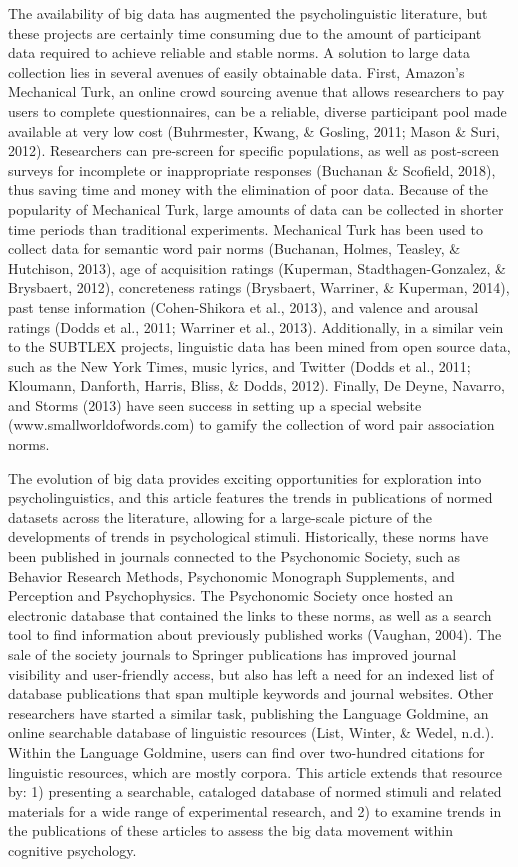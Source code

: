 \documentclass[english,,man]{apa6}
\theoremstyle{definition}
\theoremstyle{definition}
\theoremstyle{definition}
\theoremstyle{remark}
\begin{document}
The availability of big data has augmented the psycholinguistic
literature, but these projects are certainly time consuming due to the
amount of participant data required to achieve reliable and stable
norms. A solution to large data collection lies in several avenues of
easily obtainable data. First, Amazon's Mechanical Turk, an online crowd
sourcing avenue that allows researchers to pay users to complete
questionnaires, can be a reliable, diverse participant pool made
available at very low cost (Buhrmester, Kwang, \& Gosling, 2011; Mason
\& Suri, 2012). Researchers can pre-screen for specific populations, as
well as post-screen surveys for incomplete or inappropriate responses
(Buchanan \& Scofield, 2018), thus saving time and money with the
elimination of poor data. Because of the popularity of Mechanical Turk,
large amounts of data can be collected in shorter time periods than
traditional experiments. Mechanical Turk has been used to collect data
for semantic word pair norms (Buchanan, Holmes, Teasley, \& Hutchison,
2013), age of acquisition ratings (Kuperman, Stadthagen-Gonzalez, \&
Brysbaert, 2012), concreteness ratings (Brysbaert, Warriner, \&
Kuperman, 2014), past tense information (Cohen-Shikora et al., 2013),
and valence and arousal ratings (Dodds et al., 2011; Warriner et al.,
2013). Additionally, in a similar vein to the SUBTLEX projects,
linguistic data has been mined from open source data, such as the New
York Times, music lyrics, and Twitter (Dodds et al., 2011; Kloumann,
Danforth, Harris, Bliss, \& Dodds, 2012). Finally, De Deyne, Navarro,
and Storms (2013) have seen success in setting up a special website
(www.smallworldofwords.com) to gamify the collection of word pair
association norms.

The evolution of big data provides exciting opportunities for
exploration into psycholinguistics, and this article features the trends
in publications of normed datasets across the literature, allowing for a
large-scale picture of the developments of trends in psychological
stimuli. Historically, these norms have been published in journals
connected to the Psychonomic Society, such as Behavior Research Methods,
Psychonomic Monograph Supplements, and Perception and Psychophysics. The
Psychonomic Society once hosted an electronic database that contained
the links to these norms, as well as a search tool to find information
about previously published works (Vaughan, 2004). The sale of the
society journals to Springer publications has improved journal
visibility and user-friendly access, but also has left a need for an
indexed list of database publications that span multiple keywords and
journal websites. Other researchers have started a similar task,
publishing the Language Goldmine, an online searchable database of
linguistic resources (List, Winter, \& Wedel, n.d.). Within the Language
Goldmine, users can find over two-hundred citations for linguistic
resources, which are mostly corpora. This article extends that resource
by: 1) presenting a searchable, cataloged database of normed stimuli and
related materials for a wide range of experimental research, and 2) to
examine trends in the publications of these articles to assess the big
data movement within cognitive psychology.
\end{document}
